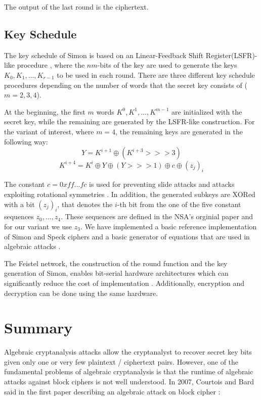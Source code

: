 The output of the last round is the ciphertext.
\subsection{Key Schedule}
The key schedule of Simon is based on an Linear-Feedback Shift Register(LSFR)-like procedure \cite{lindell2014introduction}, where the $nm$-bits of the key are used to generate the keys $K_0,K_1,...,K_{r-1}$ to be used in each round. There are three different key schedule procedures depending on the number of words that the secret key consists of ($m=2,3,4$).

At the beginning, the first $m$ words $K^0,K^1,...,K^{m-1}$ are initialized with the secret key, while the remaining are generated by the LSFR-like construction. For the variant of  interest, where $m=4$, the remaining keys are generated in the following way:
\begin{equation}
Y=K^{i+1}\oplus (K^{i+3}>>>3)
\end{equation}
\begin{equation}
K^{i+4}=K^i\oplus Y \oplus (Y>>>1)\oplus c\oplus (z_j)_i
\end{equation}

The constant $c=0xff...fc$ is used for preventing slide attacks and attacks exploiting rotational symmetries \cite{NSAciphers}. In addition, the generated subkeys are XORed with a bit $(z_j)_i$, that denotes the $i$-th bit from the one of the five constant sequences $z_0,...,z_4$. These sequences are defined in the NSA's orginial paper \cite{NSAciphers} and for our variant we use $z_3$. We have implemented a basic reference implementation of Simon and Speck ciphers and a basic generator of equations that are used in algebraic attacks \cite{simonref} .

The Feistel network, the construction of the round function and the key generation of Simon, enables bit-serial hardware architectures which can significantly reduce the cost of implementation \cite{simoneff}. Additionally, encryption and decryption can be done using the
same hardware.

\section{Summary} \label{sec:ACCxty}
Algebraic cryptanalysis attacks allow the cryptanalyst to recover secret key bits given only one or very few plaintext / ciphertext pairs. However, one of the fundamental problems of algebraic cryptanalysis is that the runtime of algebraic attacks against block ciphers is not well understood. In 2007, Courtois and Bard said in the first paper describing an algebraic attack on block cipher \cite{DEScourtois}:

